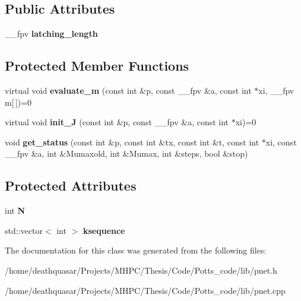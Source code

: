 \subsection*{Public Attributes}
\begin{DoxyCompactItemize}
\item 
\hypertarget{class_p_net_ac21a9a2f6de2fc6094bdfacc78142ffe}{}\+\_\+\+\_\+fpv {\bfseries latching\+\_\+length}\label{class_p_net_ac21a9a2f6de2fc6094bdfacc78142ffe}

\end{DoxyCompactItemize}
\subsection*{Protected Member Functions}
\begin{DoxyCompactItemize}
\item 
\hypertarget{class_p_net_a6d519b171b571fccbc1d263ff40822e3}{}virtual void {\bfseries evaluate\+\_\+m} (const int \&p, const \+\_\+\+\_\+fpv \&a, const int $\ast$xi, \+\_\+\+\_\+fpv m\mbox{[}$\,$\mbox{]})=0\label{class_p_net_a6d519b171b571fccbc1d263ff40822e3}

\item 
\hypertarget{class_p_net_aeef297a15dc839818cd560228c9b8236}{}virtual void {\bfseries init\+\_\+\+J} (const int \&p, const \+\_\+\+\_\+fpv \&a, const int $\ast$xi)=0\label{class_p_net_aeef297a15dc839818cd560228c9b8236}

\item 
\hypertarget{class_p_net_a3c22be54795d659f2ebab3725ad93946}{}void {\bfseries get\+\_\+status} (const int \&p, const int \&tx, const int \&t, const int $\ast$xi, const \+\_\+\+\_\+fpv \&a, int \&Mumaxold, int \&Mumax, int \&steps, bool \&stop)\label{class_p_net_a3c22be54795d659f2ebab3725ad93946}

\end{DoxyCompactItemize}
\subsection*{Protected Attributes}
\begin{DoxyCompactItemize}
\item 
\hypertarget{class_p_net_a165f64c0fb771ebbcb5851b27373cf30}{}int {\bfseries N}\label{class_p_net_a165f64c0fb771ebbcb5851b27373cf30}

\item 
\hypertarget{class_p_net_ab636bd102fd68c5801c1b907dba52e9d}{}std\+::vector$<$ int $>$ {\bfseries ksequence}\label{class_p_net_ab636bd102fd68c5801c1b907dba52e9d}

\end{DoxyCompactItemize}


The documentation for this class was generated from the following files\+:\begin{DoxyCompactItemize}
\item 
/home/deathquasar/\+Projects/\+M\+H\+P\+C/\+Thesis/\+Code/\+Potts\+\_\+code/lib/pnet.\+h\item 
/home/deathquasar/\+Projects/\+M\+H\+P\+C/\+Thesis/\+Code/\+Potts\+\_\+code/lib/pnet.\+cpp\end{DoxyCompactItemize}
